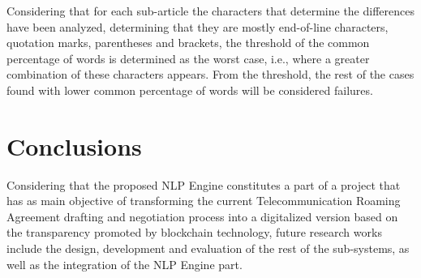 \documentclass[conference]{style/IEEEtran}
\begin{document}
Considering that for each sub-article the characters that determine the differences have been analyzed, determining that they are mostly end-of-line characters, quotation marks, parentheses and brackets, the threshold of the common percentage of words is determined as the worst case, i.e., where a greater combination of these characters appears. From the threshold, the rest of the cases found with lower common percentage of words will be considered failures.

\section{Conclusions}
Considering that the proposed NLP Engine constitutes a part of a project that has as main objective of transforming the current Telecommunication Roaming Agreement drafting and negotiation process into a digitalized version based on the transparency promoted by blockchain technology, future research works include the design, development and evaluation of the rest of the sub-systems, as well as the integration of the NLP Engine part. 

\printbibliography

\vspace{12pt}
\end{document}
